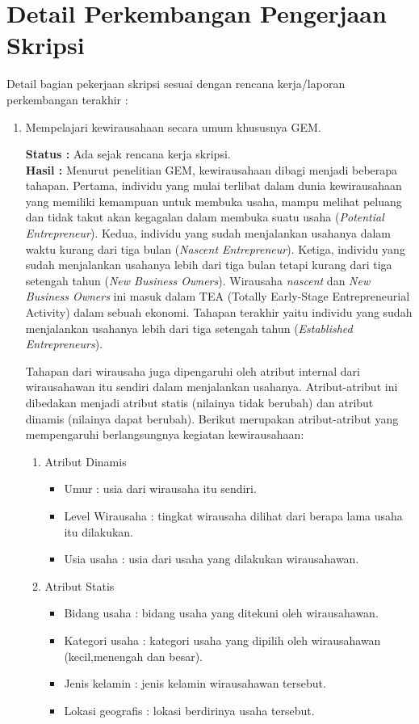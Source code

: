 \documentclass[a4paper,twoside]{article}
\begin{document}
\section{Detail Perkembangan Pengerjaan Skripsi}
Detail bagian pekerjaan skripsi sesuai dengan rencana kerja/laporan perkembangan terakhir :
	\begin{enumerate}
		\item Mempelajari kewirausahaan secara umum khususnya GEM.
		
		
		{\bf Status :} Ada sejak rencana kerja skripsi.\\
		{\bf Hasil :} 
		Menurut penelitian GEM, kewirausahaan dibagi menjadi beberapa tahapan. Pertama, individu yang mulai terlibat dalam dunia kewirausahaan yang memiliki kemampuan untuk membuka usaha, mampu melihat peluang dan tidak takut akan kegagalan dalam membuka suatu usaha (\textit{Potential Entrepreneur}). Kedua, individu yang sudah menjalankan usahanya dalam waktu kurang dari tiga bulan (\textit{Nascent Entrepreneur}). Ketiga, individu yang sudah menjalankan usahanya lebih dari tiga bulan tetapi kurang dari tiga setengah tahun (\textit{New Business Owners}). Wirausaha \textit{nascent} dan \textit{New Business Owners} ini masuk dalam TEA (Totally Early-Stage Entrepreneurial Activity) dalam sebuah ekonomi. Tahapan terakhir yaitu individu yang sudah menjalankan usahanya lebih dari tiga setengah tahun (\textit{Established Entrepreneurs}).
		

Tahapan dari wirausaha juga dipengaruhi oleh atribut internal dari wirausahawan itu sendiri dalam menjalankan usahanya. Atribut-atribut ini dibedakan menjadi atribut statis (nilainya tidak berubah) dan atribut dinamis (nilainya dapat berubah). Berikut merupakan atribut-atribut yang mempengaruhi berlangsungnya kegiatan kewirausahaan:
			\begin{enumerate}
				\item Atribut Dinamis
					\begin{itemize}
						\item Umur : usia dari wirausaha itu sendiri.
						\item Level Wirausaha : tingkat wirausaha dilihat dari berapa lama usaha itu dilakukan.
						\item Usia usaha : usia dari usaha yang dilakukan wirausahawan.
					\end{itemize}
				\item Atribut Statis
					\begin{itemize}
						\item Bidang usaha : bidang usaha yang ditekuni oleh wirausahawan.
						\item Kategori usaha : kategori usaha yang dipilih oleh wirausahawan (kecil,menengah dan besar).
						\item Jenis kelamin : jenis kelamin wirausahawan tersebut.
						\item Lokasi geografis : lokasi berdirinya usaha tersebut.
					\end{itemize}
			\end{enumerate}



\end{enumerate}
\end{document}

